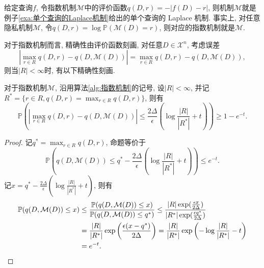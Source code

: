 \begin{note}
  给定查询$f$, 令指数机制$\mathcal{M}$中的评价函数$q(D, r) = - |f(D) - r|$, 则机制$\mathcal{M}$就是例子\ref{exa:单个查询的Laplace机制}给出的单个查询的 Laplace 机制. 事实上, 对任意隐私机制$\mathcal{M}$, 令$q(D, r) = \log\mathbb P(\mathcal{M}(D) = r) $, 则对应的指数机制就是$\mathcal{M}$.
\end{note}
对于指数机制而言, 精确性由评价函数刻画, 对任意$D \in \mathcal{X}^n$, 考虑误差
\[
  \left|\max_{r\in R}q(D, r) - q(D, \mathcal{M}(D))\right| = \max_{r\in R}q(D, r) - q(D, \mathcal{M}(D)),
\]
则当$|R|<\infty$时, 有以下精确性刻画.
\begin{thm}[指数机制精确性]\label{thm:指数机制精确性}
  对于指数机制$\mathcal{M}$, 沿用算法\ref{alg:指数机制}的记号, 设$|R| < \infty$, 并记$R^* = \{r\in R, q(D, r) = \max_{r\in R}q(D, r) \}$, 则有
  \[
    \mathbb P\left(\left|\max_{r\in R}q(D, r) - q(D, \mathcal{M}(D))\right| \le \frac{2\Delta}{\epsilon}\left(\log\frac{|R|}{|R^*|} + t\right)\right) \ge 1 - e^{-t}.
  \]
\end{thm}
\begin{proof}
  记$q^* = \max_{r\in R}q(D, r)$, 命题等价于
  \[
    \mathbb P\left(q(D, \mathcal{M}(D)) \le q^* - \frac{2\Delta}{\epsilon}\left(\log\frac{|R|}{|R^*|} + t\right)\right) \le e^{-t}.
  \]
  记$ x = q^* - \frac{2\Delta}{\epsilon}\left(\log\frac{|R|}{|R^*|} + t\right)$, 则有
  \begin{align*}
    \mathbb P(q(D, \mathcal{M}(D)) \le x) &\le \frac{\mathbb P(q(D, \mathcal{M}(D)) \le x)}{\mathbb P(q(D, \mathcal{M}(D)) \le q^*)} \le \frac{|R|\exp(\frac{\epsilon x}{2\Delta})}{|R^*|\exp(\frac{\epsilon q^*}{2\Delta})} \\
    &= \frac{|R|}{|R^*|}\exp\left(\frac{\epsilon(x - q^*)}{2\Delta}\right) = \frac{|R|}{|R^*|}\exp\left(-\log\frac{|R|}{|R^*|} - t\right) \\
    &= e^{-t}. \qedhere
  \end{align*}
\end{proof}
